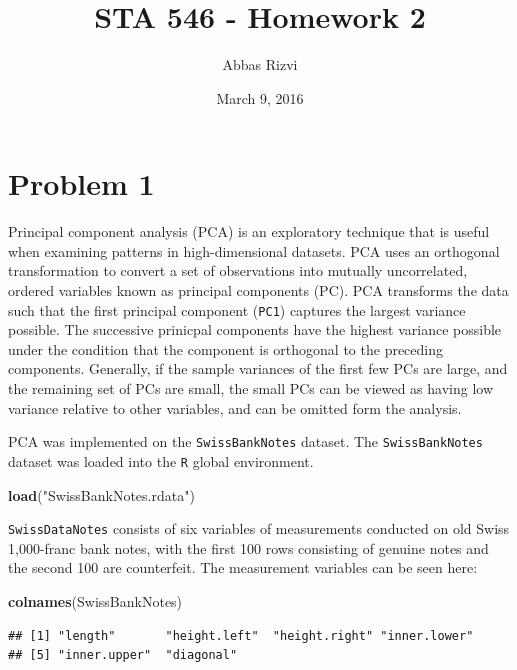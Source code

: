 \documentclass[]{article}
\title{STA 546 - Homework 2}
\author{Abbas Rizvi}
\date{March 9, 2016}
\newenvironment{Shaded}{\begin{snugshade}}{\end{snugshade}}
\newcommand{\KeywordTok}[1]{\textcolor[rgb]{0.13,0.29,0.53}{\textbf{{#1}}}}
\newcommand{\StringTok}[1]{\textcolor[rgb]{0.31,0.60,0.02}{{#1}}}
\newcommand{\NormalTok}[1]{{#1}}
\begin{document}
\maketitle


\section{Problem 1}\label{problem-1}

Principal component analysis (PCA) is an exploratory technique that is
useful when examining patterns in high-dimensional datasets. PCA uses an
orthogonal transformation to convert a set of observations into mutually
uncorrelated, ordered variables known as principal components (PC). PCA
transforms the data such that the first principal component
(\texttt{PC1}) captures the largest variance possible. The successive
prinicpal components have the highest variance possible under the
condition that the component is orthogonal to the preceding components.
Generally, if the sample variances of the first few PCs are large, and
the remaining set of PCs are small, the small PCs can be viewed as
having low variance relative to other variables, and can be omitted form
the analysis.

PCA was implemented on the \texttt{SwissBankNotes} dataset. The
\texttt{SwissBankNotes} dataset was loaded into the \texttt{R} global
environment.

\begin{Shaded}
\begin{Highlighting}[]
\KeywordTok{load}\NormalTok{(}\StringTok{"SwissBankNotes.rdata"}\NormalTok{)}
\end{Highlighting}
\end{Shaded}

\texttt{SwissDataNotes} consists of six variables of measurements
conducted on old Swiss 1,000-franc bank notes, with the first 100 rows
consisting of genuine notes and the second 100 are counterfeit. The
measurement variables can be seen here:

\begin{Shaded}
\begin{Highlighting}[]
\KeywordTok{colnames}\NormalTok{(SwissBankNotes)}
\end{Highlighting}
\end{Shaded}

\begin{verbatim}
## [1] "length"       "height.left"  "height.right" "inner.lower" 
## [5] "inner.upper"  "diagonal"
\end{verbatim}
\end{document}
